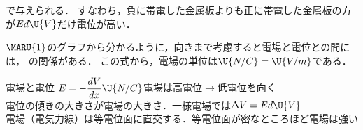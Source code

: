 
\noindent で与えられる．
すなわち，{\gtfamily 負に帯電した金属板よりも正に帯電した金属板の方が$Ed\U{V}$だけ電位が高い}．

$\MARU{1}$のグラフから分かるように，向きまで考慮すると電場と電位との間には，
の関係がある．
この式から，電場の単位は$\U{N/C}=\U{V/m}$である．

\begin{matome}{電場と電位}
 \hspace{3mm} $E=-\dfrac{dV}{dx}\U{N/C}$\hspace{6mm}電場は{\gtfamily 高電位$\rightarrow$低電位}を向く\\[1mm]
 \hspace{3mm} {\gtfamily 電位の傾きの大きさが電場の大きさ}．一様電場では$\Delta V=Ed\U{V}$\\[1mm]
 \hspace{3mm} 電場（電気力線）は{\gtfamily 等電位面に直交する}．等電位面が密なところほど電場は強い
\end{matome}

